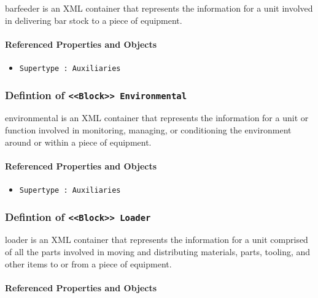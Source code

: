 \FloatBarrier

barfeeder is an XML container that represents the information for a unit involved in delivering bar stock to a piece of equipment.

\FloatBarrier
\paragraph{Referenced Properties and Objects}

\begin{itemize}
\item \texttt{Supertype : Auxiliaries}

\end{itemize}
\FloatBarrier
\subsubsection{Defintion of \texttt{<<Block>> Environmental}}
  \label{type:Environmental}

\FloatBarrier

environmental is an XML container that represents the information for a unit or function involved in monitoring, managing, or conditioning the environment around or within a piece of equipment.

\FloatBarrier
\paragraph{Referenced Properties and Objects}

\begin{itemize}
\item \texttt{Supertype : Auxiliaries}

\end{itemize}
\FloatBarrier
\subsubsection{Defintion of \texttt{<<Block>> Loader}}
  \label{type:Loader}

\FloatBarrier

loader is an XML container that represents the information for a unit comprised of all the parts involved in moving and distributing materials, parts, tooling, and other items to or from a piece of equipment.

\FloatBarrier
\paragraph{Referenced Properties and Objects}

